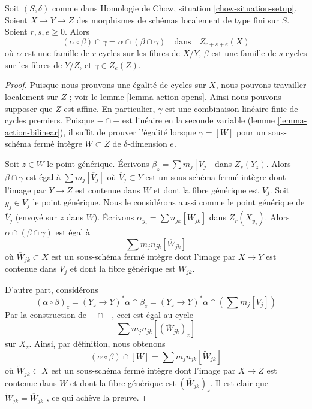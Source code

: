 \begin{lemma} 
\label{lemma-construction-composition} 
Soit $(S, \delta)$ comme dans Homologie de Chow, situation \ref{chow-situation-setup}. 
Soient $X \to Y \to Z$  des morphismes de schémas localement de type fini sur  $S$. 
Soient $r, s, e \geq 0$. Alors 
$$
(\alpha \circ \beta) \cap \gamma = \alpha \cap (\beta \cap \gamma)
\quad\text{dans}\quad Z_{r + s + e}(X)
$$
 où  $\alpha$  est une famille de  $r$-cycles sur les fibres de $X/Y$,  
$\beta$  est une famille de  $s$-cycles sur les fibres de  $Y/Z$, et  $\gamma \in Z_e(Z)$. 
\end{lemma} 

\begin{proof} 
Puisque nous prouvons une égalité de cycles sur  $X$, nous pouvons travailler localement
 sur $Z$ ; voir le lemme \ref{lemma-action-opens}. Ainsi nous pouvons supposer que  $Z$
  est affine. En particulier,  $\gamma$  est une combinaison linéaire finie de cycles 
premiers. Puisque $- \cap -$ est linéaire en la seconde variable
 (lemme \ref{lemma-action-bilinear}), il suffit de
 prouver l'égalité lorsque $\gamma = [W]$ pour un sous-schéma fermé intègre 
$W \subset Z$ de $\delta$-dimension $e$. 

\medskip\noindent
 Soit $z \in W$ le point générique. Écrivons $\beta_z = \sum m_j[V_j]$
 dans $Z_s(Y_z)$. Alors  $\beta \cap \gamma$  est égal à  $\sum m_j[\overline{V}_j]$
  où  $\overline{V}_j \subset Y$  est un sous-schéma fermé intègre dont 
l'image par $Y \to Z$ est contenue dans $W$ et dont la fibre générique est $V_j$.
 Soit $y_j \in V_j$ le point générique. Nous le considérons aussi
 comme le point générique de $\overline{V}_j$ (envoyé sur $z$ dans $W$). 
Écrivons $\alpha_{y_j} = \sum n_{jk} [W_{jk}]$ dans $Z_r(X_{y_j})$.
 Alors $\alpha \cap (\beta \cap \gamma)$  est égal à 
$$
\sum m_j n_{jk} [\overline{W}_{jk}]
$$
 où $\overline{W}_{jk} \subset X$ est un sous-schéma fermé intègre dont 
l'image par $X \to Y$ est contenue dans $\overline{V}_j$ et dont la fibre générique est $W_{jk}$. 

\medskip\noindent
 D'autre part, considérons 
$$
(\alpha \circ \beta)_z = (Y_z \to Y)^*\alpha \cap \beta_z =
(Y_z \to Y)^*\alpha \cap (\sum m_j [V_j])
$$
 Par la construction de $- \cap -$, ceci est égal au cycle 
$$
\sum m_j n_{jk} [(\overline{W}_{jk})_z]
$$
 sur  $X_z$. Ainsi, par définition, nous obtenons 
$$
(\alpha \circ \beta) \cap [W] =
\sum m_j n_{jk} [\widetilde{W}_{jk}]
$$
 où $\widetilde{W}_{jk} \subset X$ est un sous-schéma fermé intègre dont
 l'image par $X \to Z$ est contenue dans $W$ et dont la fibre générique est $(\overline{W}_{jk})_z$.
 Il est clair que $\widetilde{W}_{jk} = \overline{W}_{jk}$
 , ce qui achève la preuve. 
\end{proof} 









